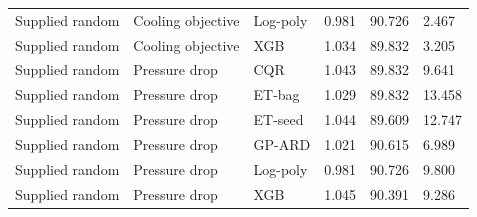 \begin{longtable}{llllll}
Supplied random & Cooling objective & Log-poly & 0.981 & 90.726 & 2.467\\
Supplied random & Cooling objective & XGB & 1.034 & 89.832 & 3.205\\
Supplied random & Pressure drop & CQR & 1.043 & 89.832 & 9.641\\
Supplied random & Pressure drop & ET-bag & 1.029 & 89.832 & 13.458\\
Supplied random & Pressure drop & ET-seed & 1.044 & 89.609 & 12.747\\
Supplied random & Pressure drop & GP-ARD & 1.021 & 90.615 & 6.989\\
Supplied random & Pressure drop & Log-poly & 0.981 & 90.726 & 9.800\\
Supplied random & Pressure drop & XGB & 1.045 & 90.391 & 9.286\\
\bottomrule\end{longtable}\endgroup
